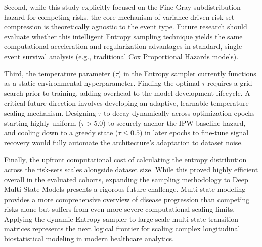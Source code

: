 \documentclass[a4paper,twoside,12pt]{report}
\begin{document}
Second, while this study explicitly focused on the Fine-Gray subdistribution hazard for competing risks, the core mechanism of variance-driven risk-set compression is theoretically agnostic to the event type. Future research should evaluate whether this intelligent Entropy sampling technique yields the same computational acceleration and regularization advantages in standard, single-event survival analysis (e.g., traditional Cox Proportional Hazards models).

Third, the temperature parameter ($\tau$) in the Entropy sampler currently functions as a static environmental hyperparameter. Finding the optimal $\tau$ requires a grid search prior to training, adding overhead to the model development lifecycle. A critical future direction involves developing an adaptive, learnable temperature scaling mechanism. Designing $\tau$ to decay dynamically across optimization epochs starting highly uniform ($\tau > 5.0$) to securely anchor the IPW baseline hazard, and cooling down to a greedy state ($\tau \le 0.5$) in later epochs to fine-tune signal recovery would fully automate the architecture's adaptation to dataset noise.

Finally, the upfront computational cost of calculating the entropy distribution across the risk-sets scales alongside dataset size. While this proved highly efficient overall in the evaluated cohorts, expanding the sampling methodology to Deep Multi-State Models presents a rigorous future challenge. Multi-state modeling provides a more comprehensive overview of disease progression than competing risks alone but suffers from even more severe computational scaling limits. Applying the dynamic Entropy sampler to large-scale multi-state transition matrices represents the next logical frontier for scaling complex longitudinal biostatistical modeling in modern healthcare analytics.

\end{document}
